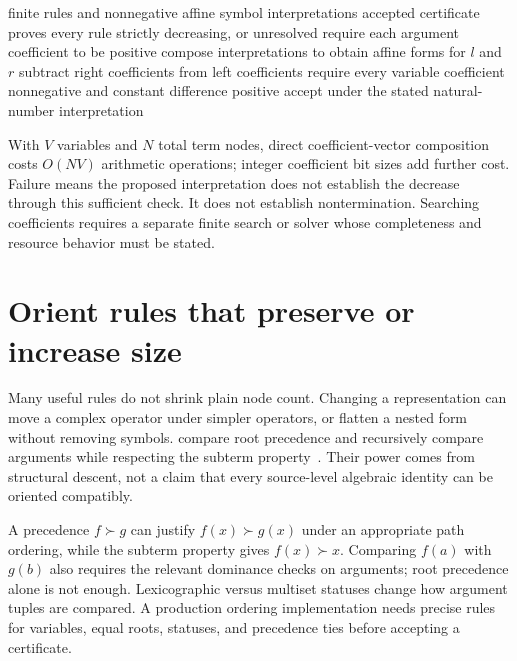 \begin{algorithm}[htbp]
\caption{Check a sufficient affine interpretation certificate over natural numbers.}
\label{alg:ch83-linear}
\begin{pseudocode}
\Require finite rules and nonnegative affine symbol interpretations
\Ensure accepted certificate proves every rule strictly decreasing, or unresolved
\State require each argument coefficient to be positive
\State compose interpretations to obtain affine forms for $l$ and $r$
\State subtract right coefficients from left coefficients
\State require every variable coefficient nonnegative and constant difference positive
\EndFor
\State accept under the stated natural-number interpretation
\end{pseudocode}
\end{algorithm}

With $V$ variables and $N$ total term nodes, direct coefficient-vector composition costs $O(NV)$ arithmetic operations; integer coefficient bit sizes add further cost.
Failure means the proposed interpretation does not establish the decrease through this sufficient check.
It does not establish nontermination.
Searching coefficients requires a separate finite search or solver whose completeness and resource behavior must be stated.

\section{Orient rules that preserve or increase size}
\label{sec:ch83-path}
Many useful rules do not shrink plain node count.
Changing a representation can move a complex operator under simpler operators, or flatten a nested form without removing symbols.
 compare root precedence and recursively compare arguments while respecting the subterm property~\cite{dershowitz-1982-orderings}.
Their power comes from structural descent, not a claim that every source-level algebraic identity can be oriented compatibly.

A precedence $f\succ g$ can justify $f(x)\succ g(x)$ under an appropriate path ordering, while the subterm property gives $f(x)\succ x$.
Comparing $f(a)$ with $g(b)$ also requires the relevant dominance checks on arguments; root precedence alone is not enough.
Lexicographic versus multiset statuses change how argument tuples are compared.
A production ordering implementation needs precise rules for variables, equal roots, statuses, and precedence ties before accepting a certificate.

